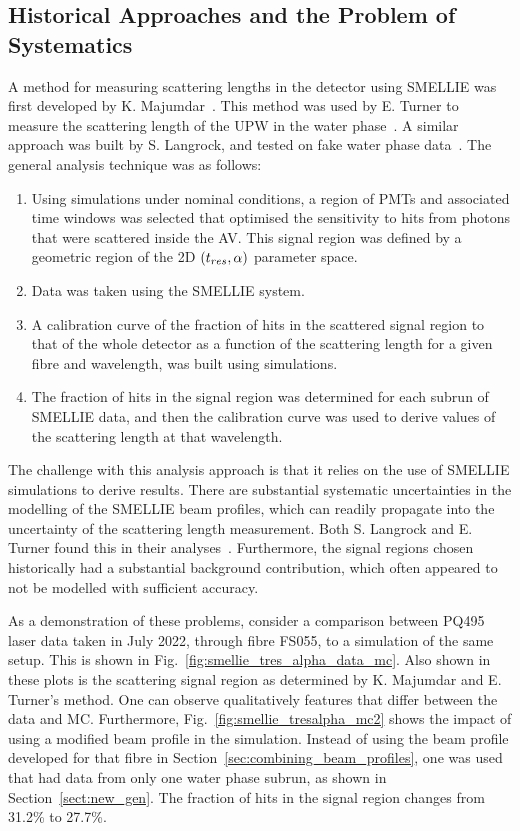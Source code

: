 \subsection{Historical Approaches and the Problem of Systematics}
A method for measuring scattering lengths in the detector using SMELLIE was first developed by K. Majumdar~\cite{majumdarMeasurementOpticalScattering2015}. This method was used by E. Turner to measure the scattering length of the UPW in the water phase~\cite{turnerMeasurementScatteringCharacteristics2022}. A similar approach was built by S. Langrock, and tested on fake water phase data~\cite{langrockMeasurementRayleighScattering2016}. The general analysis technique was as follows:
\begin{enumerate}
    \item Using simulations under nominal conditions, a region of PMTs and associated time windows was selected that optimised the sensitivity to hits from photons that were scattered inside the AV. This signal region was defined by a geometric region of the 2D $(t_{res}{},\alpha)$ parameter space.
    \item Data was taken using the SMELLIE system.
    \item A calibration curve of the fraction of hits in the scattered signal region to that of the whole detector as a function of the scattering length for a given fibre and wavelength, was built using simulations.
    \item The fraction of hits in the signal region was determined for each subrun of SMELLIE data, and then the calibration curve was used to derive values of the scattering length at that wavelength.
\end{enumerate}

The challenge with this analysis approach is that it relies on the use of SMELLIE simulations to derive results. There are substantial systematic uncertainties in the modelling of the SMELLIE beam profiles, which can readily propagate into the uncertainty of the scattering length measurement. Both S. Langrock and E. Turner found this in their analyses~\cite{langrockMeasurementRayleighScattering2016,turnerMeasurementScatteringCharacteristics2022}. Furthermore, the signal regions chosen historically had a substantial background contribution, which often appeared to not be modelled with sufficient accuracy.

As a demonstration of these problems, consider a comparison between PQ495 laser data taken in July 2022, through fibre FS055, to a simulation of the same setup. This is shown in Fig.~\ref{fig:smellie_tres_alpha_data_mc}. Also shown in these plots is the scattering signal region as determined by K. Majumdar and E. Turner's method. One can observe qualitatively features that differ between the data and MC. %
Furthermore, Fig.~\ref{fig:smellie_tresalpha_mc2} shows the impact of using a modified beam profile in the simulation. Instead of using the beam profile developed for that fibre in Section~\ref{sec:combining_beam_profiles}, one was used that had data from only one water phase subrun, as shown in Section~\ref{sect:new_gen}. The fraction of hits in the signal region changes from 31.2\% to 27.7\%.

